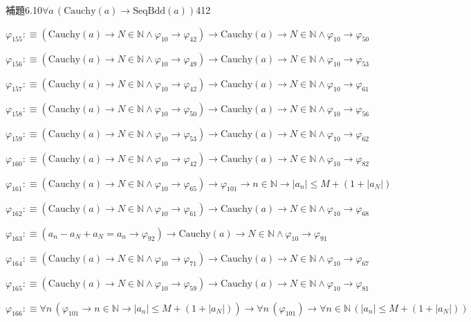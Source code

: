 \begin{fullproof}{補題6.10}{$\forall a\,(\mathrm{Cauchy}(a) \to \mathrm{SeqBdd}(a))$}{412}
\begin{abbrevlist}
\item $\varphi_{155} :\equiv (\mathrm{Cauchy}(a) \to N \in \mathbb{N} \land \varphi_{10} \to \varphi_{42}) \to \mathrm{Cauchy}(a) \to N \in \mathbb{N} \land \varphi_{10} \to \varphi_{50}$
\item $\varphi_{156} :\equiv (\mathrm{Cauchy}(a) \to N \in \mathbb{N} \land \varphi_{10} \to \varphi_{49}) \to \mathrm{Cauchy}(a) \to N \in \mathbb{N} \land \varphi_{10} \to \varphi_{53}$
\item $\varphi_{157} :\equiv (\mathrm{Cauchy}(a) \to N \in \mathbb{N} \land \varphi_{10} \to \varphi_{42}) \to \mathrm{Cauchy}(a) \to N \in \mathbb{N} \land \varphi_{10} \to \varphi_{61}$
\item $\varphi_{158} :\equiv (\mathrm{Cauchy}(a) \to N \in \mathbb{N} \land \varphi_{10} \to \varphi_{50}) \to \mathrm{Cauchy}(a) \to N \in \mathbb{N} \land \varphi_{10} \to \varphi_{56}$
\item $\varphi_{159} :\equiv (\mathrm{Cauchy}(a) \to N \in \mathbb{N} \land \varphi_{10} \to \varphi_{53}) \to \mathrm{Cauchy}(a) \to N \in \mathbb{N} \land \varphi_{10} \to \varphi_{62}$
\item $\varphi_{160} :\equiv (\mathrm{Cauchy}(a) \to N \in \mathbb{N} \land \varphi_{10} \to \varphi_{42}) \to \mathrm{Cauchy}(a) \to N \in \mathbb{N} \land \varphi_{10} \to \varphi_{82}$
\item $\varphi_{161} :\equiv (\mathrm{Cauchy}(a) \to N \in \mathbb{N} \land \varphi_{10} \to \varphi_{65}) \to \varphi_{101} \to n \in \mathbb{N} \to \lvert a_{n} \rvert \leq M + (1 + \lvert a_{N} \rvert)$
\item $\varphi_{162} :\equiv (\mathrm{Cauchy}(a) \to N \in \mathbb{N} \land \varphi_{10} \to \varphi_{61}) \to \mathrm{Cauchy}(a) \to N \in \mathbb{N} \land \varphi_{10} \to \varphi_{68}$
\item $\varphi_{163} :\equiv (a_{n} - a_{N} + a_{N} = a_{n} \to \varphi_{92}) \to \mathrm{Cauchy}(a) \to N \in \mathbb{N} \land \varphi_{10} \to \varphi_{91}$
\item $\varphi_{164} :\equiv (\mathrm{Cauchy}(a) \to N \in \mathbb{N} \land \varphi_{10} \to \varphi_{71}) \to \mathrm{Cauchy}(a) \to N \in \mathbb{N} \land \varphi_{10} \to \varphi_{67}$
\item $\varphi_{165} :\equiv (\mathrm{Cauchy}(a) \to N \in \mathbb{N} \land \varphi_{10} \to \varphi_{59}) \to \mathrm{Cauchy}(a) \to N \in \mathbb{N} \land \varphi_{10} \to \varphi_{81}$
\item $\varphi_{166} :\equiv \forall n\,(\varphi_{101} \to n \in \mathbb{N} \to \lvert a_{n} \rvert \leq M + (1 + \lvert a_{N} \rvert)) \to \forall n\,(\varphi_{101}) \to \forall n \in \mathbb{N}\,(\lvert a_{n} \rvert \leq M + (1 + \lvert a_{N} \rvert))$

\end{abbrevlist}
\end{fullproof}
